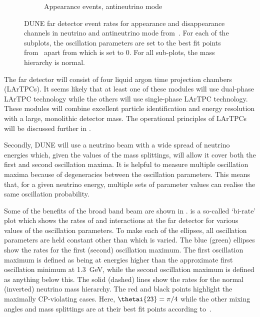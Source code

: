 \begin{figure}[h]
\begin{subfigure}[t]{.49\textwidth}
    \caption{Appearance events, antineutrino mode}
  \end{subfigure}
  \caption[DUNE far detector event rates.]{DUNE far detector event rates for appearance and disappearance channels in neutrino and antineutrino mode from~\cite{tdrVol2}. For each of the subplots, the oscillation parameters are set to the best fit points from~\cite{nufit4} apart from \dcp which is set to 0. For all sub-plots, the mass hierarchy is normal.}
  \label{fig:fdEventRates}
\end{figure}

The far detector will consist of four liquid argon time projection chambers (LArTPCs).
It seems likely that at least one of these modules will use dual-phase LArTPC technology while the others will use single-phase LArTPC technology.
These modules will combine excellent particle identification and energy resolution with a large, monolithic detector mass. 
The operational principles of LArTPCs will be discussed further in .

Secondly, DUNE will use a neutrino beam with a wide spread of neutrino energies which, given the values of the mass splittings, will allow it cover both the first and second oscillation maxima.
It is helpful to measure multiple oscillation maxima because of degeneracies between the oscillation parameters.
This means that, for a given neutrino energy, multiple sets of parameter values can realise the same oscillation probability.

Some of the benefits of the broad band beam are shown in .
 is a so-called `bi-rate' plot which shows the rates of \nue and \anue interactions at the far detector for various values of the oscillation parameters.
To make each of the ellipses, all oscillation parameters are held constant other than \dcp which is varied.
The blue (green) ellipses show the rates for the first (second) oscillation maximum.
The first oscillation maximum is defined as being at energies higher than the approximate first oscillation minimum at \SI{1.3}{\giga\electronvolt}, while the second oscillation maximum is defined as anything below this.
The solid (dashed) lines show the rates for the normal (inverted) neutrino mass hierarchy.
The red and black points highlight the maximally CP-violating cases.
Here, $\thetai{23}=\pi/4$ while the other mixing angles and mass splittings are at their best fit points according to~\cite{nufit4}.

